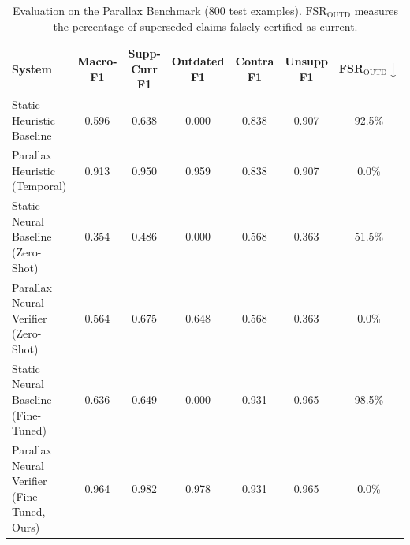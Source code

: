 \begin{table}[t]
\centering
\small
\begin{tabular}{l|c|cccc|c}
\toprule
\textbf{System} & \textbf{Macro-F1} & \textbf{Supp-Curr F1} & \textbf{Outdated F1} & \textbf{Contra F1} & \textbf{Unsupp F1} & $\mathbf{FSR}_{\text{OUTD}} \downarrow$ \\
\midrule
Static Heuristic Baseline & 0.596 & 0.638 & 0.000 & 0.838 & 0.907 & 92.5\% \\
Parallax Heuristic (Temporal) & 0.913 & 0.950 & 0.959 & 0.838 & 0.907 & 0.0\% \\
Static Neural Baseline (Zero-Shot) & 0.354 & 0.486 & 0.000 & 0.568 & 0.363 & 51.5\% \\
Parallax Neural Verifier (Zero-Shot) & 0.564 & 0.675 & 0.648 & 0.568 & 0.363 & 0.0\% \\
Static Neural Baseline (Fine-Tuned) & 0.636 & 0.649 & 0.000 & 0.931 & 0.965 & 98.5\% \\
Parallax Neural Verifier (Fine-Tuned, Ours) & 0.964 & 0.982 & 0.978 & 0.931 & 0.965 & 0.0\% \\
\bottomrule
\end{tabular}
\caption{Evaluation on the Parallax Benchmark (800 test examples). $\text{FSR}_{\text{OUTD}}$ measures the percentage of superseded claims falsely certified as current.}
\label{tab:main_results}
\end{table}
